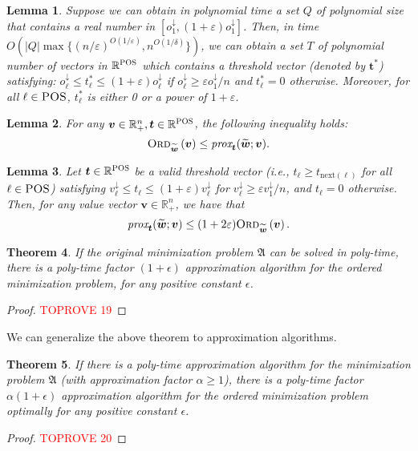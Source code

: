 \documentclass[11pt,a4paper]{article} \usepackage{enumitem}
\newcommand{\da}{\downarrow}
\newcommand{\boldv}{\boldsymbol{v}}
\newcommand{\boldw}{\boldsymbol{w}}
\newcommand{\boldt}{\boldsymbol{t}}
\newcommand{\myproblem}{\mathfrak{A}}
\newcommand{\ordered}[2]{\textsc{Ord}_{#1}\left(#2\right)}
\newcommand{\R}{\mathbb{R}}
\newcommand{\Rpos}{\mathbb{R}_+}
\newcommand{\POS}{\textsc{POS}}
\newtheorem{theorem}{Theorem}[section]
\newtheorem{lemma}[theorem]{Lemma}
\theoremstyle{definition}
\begin{document}
\begin{lemma}
Suppose we can obtain in polynomial time a set $Q$ of polynomial size that contains a real number in $[o_1^\da,(1+\varepsilon)o_1^\da]$.
Then, in time $O\left(|Q|\max\{(n/\varepsilon)^{O(1/\varepsilon)},n^{O(1/\delta)}\}\right)$, we can obtain a set $T$ of polynomial number of vectors in $\R^{\POS}$ which contains a threshold vector (denoted by $\boldsymbol{t}^*$) satisfying:
$o_\ell^\da\leq t^*_\ell\leq (1+\varepsilon)o_\ell^\da$ if $o_\ell^\da\geq \varepsilon o_1^\da/n$ and $t^*_\ell=0$ otherwise.
Moreover, for all $\ell\in \POS$,
$t^*_\ell$ is either 0 or a power of $1+\varepsilon$.
\end{lemma}

\begin{lemma}
\label{lm:C.3}
For any $\boldv\in\Rpos^n,\boldsymbol{t}\in \R^{\POS}$, 
the following inequality holds:
$$\ordered{\widetilde{\boldw}}{\boldv}\leq \text{\em prox}_{\boldt}(\widetilde{\boldw};\boldv).$$
\end{lemma}

\begin{lemma}
\label{lm:C.4}
Let $\boldsymbol{t}\in \R^{\POS}$ be a valid threshold vector
(i.e., $t_\ell \geq t_{\text{next}(\ell)}$ for all $\ell\in \POS$)
satisfying
$v_\ell^\da\leq t_\ell\leq (1+\varepsilon)v_\ell^\da$ for $v_\ell^\da\geq \varepsilon v_1^\da/n$, and $t_\ell=0$ otherwise.
Then, for any value vector $\boldv\in\Rpos^n$, we have that
$$
\text{\em prox}_{\boldsymbol{t}}(\widetilde{\boldw};\boldv)
\leq (1+2\varepsilon)\ordered{\widetilde{\boldw}}{\boldv}.$$
\end{lemma}


\begin{theorem}
If the original minimization problem $\myproblem$ can be solved in poly-time, 
there is a poly-time factor $(1+\epsilon)$ approximation algorithm for the ordered {\em minimization} problem, for any positive constant $\epsilon$.
\end{theorem}

\begin{proof}\textcolor{red}{TOPROVE 19}\end{proof}

We can generalize the above theorem to approximation algorithms.

\begin{theorem}
\label{thm:C3}
If there is a poly-time approximation algorithm for the minimization problem $\myproblem$ (with approximation factor $\alpha\geq 1$), 
there is a poly-time factor $\alpha(1+\epsilon)$ approximation algorithm for the ordered {\em minimization} problem optimally for any positive constant $\epsilon$.
\end{theorem}
\begin{proof}\textcolor{red}{TOPROVE 20}\end{proof}
\end{document}
